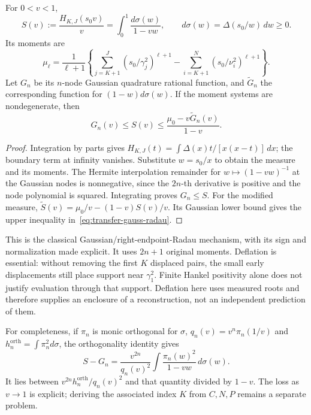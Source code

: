 \begin{proposition}
\label{prop:finite-stieltjes-transfer}
For $0<v<1$,
\[
 S(v):=\frac{H_{K,J}(s_0v)}v
    =\int_0^1\frac{d\sigma(w)}{1-vw},\qquad
 d\sigma(w)=\Delta(s_0/w)\,dw\ge0.
\]
Its moments are
\[
 \mu_\ell=\frac1{\ell+1}\left\{
 \sum_{j=K+1}^{J}(s_0/\gamma_j^2)^{\ell+1}
 -\sum_{i=K+1}^{N}(s_0/\nu_i^2)^{\ell+1}\right\}.
\]
Let $G_n$ be its $n$-node Gaussian quadrature rational function, and
$\widetilde G_n$ the corresponding function for $(1-w)d\sigma(w)$.
If the moment systems are nondegenerate, then
\begin{equation}\label{eq:transfer-gauss-radau}
 G_n(v)\le S(v)\le
       \frac{\mu_0-v\widetilde G_n(v)}{1-v}.
\end{equation}
\end{proposition}
\begin{proof}
Integration by parts gives
$H_{K,J}(t)=\int\Delta(x)t/[x(x-t)]\,dx$; the boundary term at infinity
vanishes. Substitute $w=s_0/x$ to obtain the measure and its moments.
The Hermite interpolation remainder for $w\mapsto(1-vw)^{-1}$ at the
Gaussian nodes is nonnegative, since the $2n$-th derivative is positive
and the node polynomial is squared. Integrating proves $G_n\le S$.
For the modified measure,
$\widetilde S(v)=\mu_0/v-(1-v)S(v)/v$. Its Gaussian lower bound gives
the upper inequality in~\eqref{eq:transfer-gauss-radau}.
\end{proof}

This is the classical Gaussian/right-endpoint-Radau mechanism, with its
sign and normalization made explicit. It uses $2n+1$ original moments.
Deflation is essential: without removing the first $K$ displaced pairs,
the small early displacements still place support near $\gamma_1^2$.
Finite Hankel positivity alone does not justify evaluation through that
support. Deflation here uses measured roots and therefore supplies an
enclosure of a reconstruction, not an independent prediction of them.

For completeness, if $\pi_n$ is monic orthogonal for $\sigma$,
$q_n(v)=v^n\pi_n(1/v)$ and $h_n^{\mathrm{orth}}=\int\pi_n^2d\sigma$,
the orthogonality identity gives
\[
 S-G_n=\frac{v^{2n}}{q_n(v)^2}
       \int\frac{\pi_n(w)^2}{1-vw}\,d\sigma(w).
\]
It lies between $v^{2n}h_n^{\mathrm{orth}}/q_n(v)^2$ and that quantity
divided by $1-v$. The loss as $v\to1$ is explicit; deriving the associated
index $K$ from $C,N,P$ remains a separate problem.


